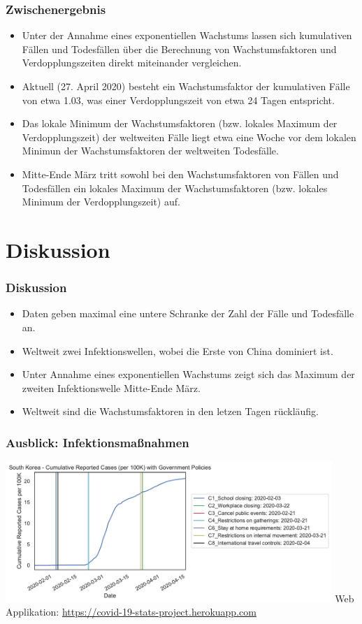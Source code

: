 \documentclass{beamer}
\begin{document}
 \begin{frame}
 	\frametitle{Zwischenergebnis}
 	\begin{itemize}
 		\item Unter der Annahme eines exponentiellen Wachstums lassen sich kumulativen Fällen und Todesfällen über die Berechnung von Wachstumsfaktoren und Verdopplungszeiten direkt miteinander vergleichen. 
 		\item Aktuell (27. April 2020) besteht ein Wachstumsfaktor der kumulativen Fälle von etwa 1.03, was einer Verdopplungszeit von etwa 24 Tagen entspricht.
 		\item Das lokale Minimum der Wachstumsfaktoren (bzw. lokales Maximum der Verdopplungszeit) der weltweiten Fälle liegt etwa eine Woche vor dem lokalen Minimun der Wachstumsfaktoren der weltweiten Todesfälle.
 		\item Mitte-Ende März tritt sowohl bei den Wachstumsfaktoren von Fällen und Todesfällen ein lokales Maximum der Wachstumsfaktoren (bzw. lokales Minimum der Verdopplungszeit) auf.
 	\end{itemize}
 \end{frame}

\section{Diskussion}
\begin{frame}
	\frametitle{Diskussion}
	\begin{itemize}
		\item Daten geben maximal eine untere Schranke der Zahl der Fälle und Todesfälle an.
		\item Weltweit zwei Infektionswellen, wobei die Erste von China dominiert ist.
		\item Unter Annahme eines exponentiellen Wachstums zeigt sich das Maximum der zweiten Infektionswelle Mitte-Ende März.
		\item Weltweit sind die Wachstumsfaktoren in den letzen Tagen rückläufig.
	\end{itemize}
\end{frame}

\begin{frame}
	\frametitle{Ausblick: Infektionsmaßnahmen}
	\centering
	\includegraphics[width = 350pt]{korea}
	\pause
	Web Applikation: \url{https://covid-19-stats-project.herokuapp.com}
\end{frame}
\end{document}
